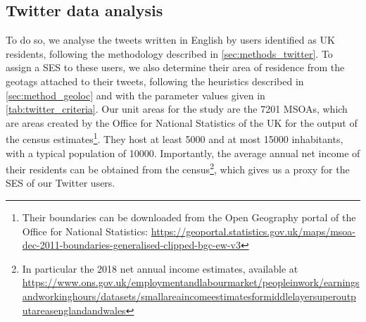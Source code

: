 \documentclass[../thesis.tex]{subfiles}
\begin{document}
\subsection{Twitter data analysis}
To do so, we analyse the tweets written in English by users identified as UK residents,
following the methodology described in \cref{sec:methods_twitter}. To assign a \ac{SES}
to these users, we also determine their area of residence from the geotags attached to
their tweets, following the heuristics described in \cref{sec:method_geoloc} and with the parameter values given in \cref{tab:twitter_criteria}.
Our unit areas for the study are the \SI{7201}{} \acp{MSOA}, which are
areas created by the Office for National Statistics of the UK for the output of the
census estimates\footnote{Their boundaries can be downloaded from the Open Geography
portal of the Office for National Statistics:
\url{https://geoportal.statistics.gov.uk/maps/msoa-dec-2011-boundaries-generalised-clipped-bgc-ew-v3}}.
They host at least \SI{5000}{} and at most \SI{15000}{} inhabitants, with a typical
population of \SI{10000}{}. Importantly, the average annual net income of their
residents can be obtained from the census\footnote{In particular the 2018 net annual
income estimates, available at
\url{https://www.ons.gov.uk/employmentandlabourmarket/peopleinwork/earningsandworkinghours/datasets/smallareaincomeestimatesformiddlelayersuperoutputareasenglandandwales}},
which gives us a proxy for the \ac{SES} of our Twitter users.
\end{document}
